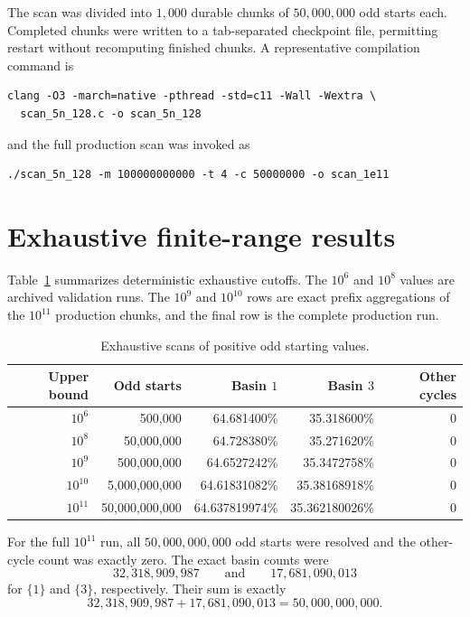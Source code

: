 \documentclass[11pt]{article}
\begin{document}
The scan was divided into $1,000$ durable chunks of $50,000,000$ odd starts each. Completed chunks were written to a tab-separated checkpoint file, permitting restart without recomputing finished chunks. A representative compilation command is
\begin{verbatim}
clang -O3 -march=native -pthread -std=c11 -Wall -Wextra \
  scan_5n_128.c -o scan_5n_128
\end{verbatim}
and the full production scan was invoked as
\begin{verbatim}
./scan_5n_128 -m 100000000000 -t 4 -c 50000000 -o scan_1e11
\end{verbatim}

\section{Exhaustive finite-range results}

Table~\ref{tab:cutoffs} summarizes deterministic exhaustive cutoffs. The $10^6$ and $10^8$ values are archived validation runs. The $10^9$ and $10^{10}$ rows are exact prefix aggregations of the $10^{11}$ production chunks, and the final row is the complete production run.

\begin{table}[ht]
\centering
\small
\begin{tabular}{@{}rrrrr@{}}
\toprule
Upper bound & Odd starts & Basin $1$ & Basin $3$ & Other cycles\\
\midrule
$10^6$ & 500,000 & 64.681400\% & 35.318600\% & 0\\
$10^8$ & 50,000,000 & 64.728380\% & 35.271620\% & 0\\
$10^9$ & 500,000,000 & 64.6527242\% & 35.3472758\% & 0\\
$10^{10}$ & 5,000,000,000 & 64.61831082\% & 35.38168918\% & 0\\
$10^{11}$ & 50,000,000,000 & 64.637819974\% & 35.362180026\% & 0\\
\bottomrule
\end{tabular}
\caption{Exhaustive scans of positive odd starting values.}
\label{tab:cutoffs}
\end{table}

For the full $10^{11}$ run, all $50,000,000,000$ odd starts were resolved and the other-cycle count was exactly zero. The exact basin counts were
\[
32,318,909,987
\qquad\text{and}\qquad
17,681,090,013
\]
for $\{1\}$ and $\{3\}$, respectively. Their sum is exactly
\[
32,318,909,987+17,681,090,013
=50,000,000,000.
\]
\end{document}
